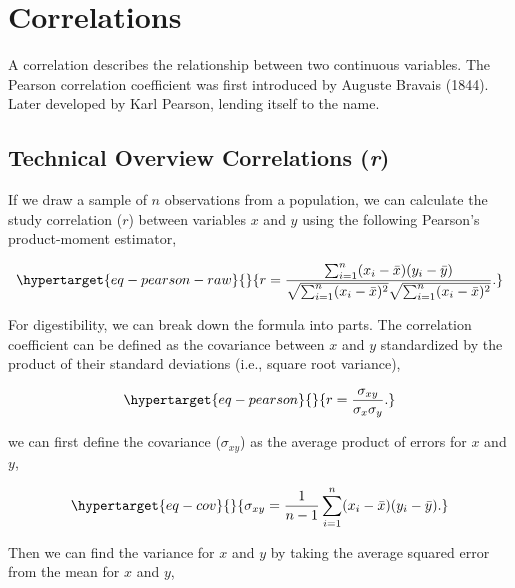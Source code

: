 \documentclass[
  letterpaper,
  DIV=11,
  numbers=noendperiod]{scrreprt}
\begin{document}
\hypertarget{correlations}{%
\section{Correlations}\label{correlations}}

A correlation describes the relationship between two continuous
variables. The Pearson correlation coefficient was first introduced by
Auguste Bravais (1844). Later developed by Karl Pearson, lending itself
to the name.

\hypertarget{technical-overview-correlations-r}{%
\subsection{\texorpdfstring{Technical Overview Correlations
(\emph{r})}{Technical Overview Correlations (r)}}\label{technical-overview-correlations-r}}

If we draw a sample of \(n\) observations from a population, we can
calculate the study correlation (\(r\)) between variables \(x\) and
\(y\) using the following Pearson's product-moment estimator,

\begin{equation}\protect\hypertarget{eq-pearson-raw}{}{
r = \frac{
\sum_{i=1}^{n}(x_i - \bar{x})(y_i - \bar{y})
}{
\sqrt{\sum_{i=1}^{n}(x_i - \bar{x})^2}
\sqrt{\sum_{i=1}^{n}(x_i - \bar{x})^2}
}.
}\label{eq-pearson-raw}\end{equation}

For digestibility, we can break down the formula into parts. The
correlation coefficient can be defined as the covariance between \(x\)
and \(y\) standardized by the product of their standard deviations
(i.e., square root variance),

\begin{equation}\protect\hypertarget{eq-pearson}{}{
r = \frac{\sigma_{xy}}
{\sigma_x\sigma_y}.
}\label{eq-pearson}\end{equation}

we can first define the covariance (\(\sigma_{xy}\)) as the average
product of errors for \(x\) and \(y\),

\begin{equation}\protect\hypertarget{eq-cov}{}{
\sigma_{xy} =\frac{1}{n-1}\sum_{i=1}^{n}(x_i - \bar{x})(y_i - \bar{y}).
}\label{eq-cov}\end{equation}

Then we can find the variance for \(x\) and \(y\) by taking the average
squared error from the mean for \(x\) and \(y\),
\end{document}
